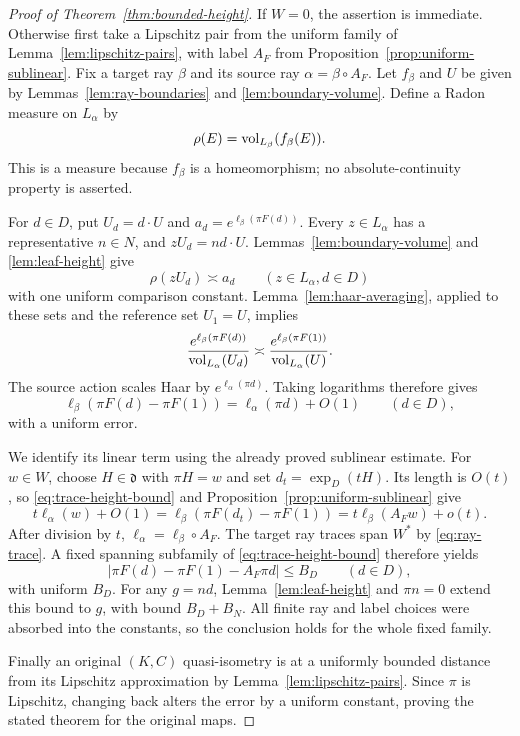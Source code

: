 \begin{proof}[Proof of Theorem~\ref{thm:bounded-height}]
If $W=0$, the assertion is immediate.  Otherwise first take a
Lipschitz pair from the uniform family of
Lemma~\ref{lem:lipschitz-pairs}, with label $A_F$ from
Proposition~\ref{prop:uniform-sublinear}.
Fix a target ray $\beta$ and its source ray
$\alpha=\beta\circ A_F$.  Let $f_\beta$ and $U$ be given by
Lemmas~\ref{lem:ray-boundaries} and \ref{lem:boundary-volume}.
Define a Radon measure on $L_\alpha$ by
\[
 \rho(E)=\operatorname{vol}_{L_\beta}(f_\beta(E)).
\]
This is a measure because $f_\beta$ is a homeomorphism; no
absolute-continuity property is asserted.

For $d\in D$, put $U_d=d\cdot U$ and
$a_d=e^{\ell_\beta(\pi F(d))}$.
Every $z\in L_\alpha$ has a representative $n\in N$, and
$zU_d=nd\cdot U$.
Lemmas~\ref{lem:boundary-volume} and \ref{lem:leaf-height} give
\[
 \rho(zU_d)\asymp a_d
 \qquad(z\in L_\alpha,d\in D)
\]
with one uniform comparison constant.
Lemma~\ref{lem:haar-averaging}, applied to these sets and the
reference set $U_1=U$, implies
\[
 \frac{e^{\ell_\beta(\pi F(d))}}{\operatorname{vol}_{L_\alpha}(U_d)}
 \asymp
 \frac{e^{\ell_\beta(\pi F(1))}}{\operatorname{vol}_{L_\alpha}(U)}.
\]
The source action scales Haar by $e^{\ell_\alpha(\pi d)}$.
Taking logarithms therefore gives
\begin{equation}
\label{eq:trace-height-bound}
 \ell_\beta(\pi F(d)-\pi F(1))
 =\ell_\alpha(\pi d)+O(1)
 \qquad(d\in D),
\end{equation}
with a uniform error.

We identify its linear term using the already proved sublinear
estimate.  For $w\in W$, choose $H\in\mathfrak d$ with $\pi H=w$
and set $d_t=\exp_D(tH)$.  Its length is $O(t)$, so
\eqref{eq:trace-height-bound} and
Proposition~\ref{prop:uniform-sublinear} give
\[
 t\ell_\alpha(w)+O(1)
 =\ell_\beta(\pi F(d_t)-\pi F(1))
 =t\ell_\beta(A_Fw)+o(t).
\]
After division by $t$,
$\ell_\alpha=\ell_\beta\circ A_F$.
The target ray traces span $W^*$ by \eqref{eq:ray-trace}.
A fixed spanning subfamily of \eqref{eq:trace-height-bound}
therefore yields
\[
 |\pi F(d)-\pi F(1)-A_F\pi d|\le B_D
 \qquad(d\in D),
\]
with uniform $B_D$.
For any $g=nd$, Lemma~\ref{lem:leaf-height} and $\pi n=0$
extend this bound to $g$, with bound $B_D+B_N$.
All finite ray and label choices were absorbed into the constants,
so the conclusion holds for the whole fixed family.

Finally an original $(K,C)$ quasi-isometry is at a uniformly
bounded distance from its Lipschitz approximation by
Lemma~\ref{lem:lipschitz-pairs}.  Since $\pi$ is Lipschitz,
changing back alters the error by a uniform constant, proving
the stated theorem for the original maps.
\end{proof}
